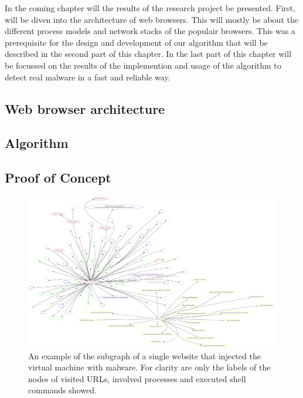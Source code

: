 
In the coming chapter will the results of the research project be presented. First, will be diven into the architecture of web browsers. This will mostly be about the different process models and network stacks of the populair browsers. This was a prerequisite for the design and development of our algorithm that will be described in the second part of this chapter. In the last part of this chapter will be focussed on the results of the implemention and usage of the algorithm to detect real malware  in a fast and reliable way.

\subsection{Web browser architecture}


\subsection{Algorithm}


\subsection{Proof of Concept}



\begin{figure}[h]
    \centering
    \includegraphics[width=25cm, angle=90]{Images/report_Subprocess_from_tab}
    \caption{An example of the subgraph of a single website that injected the virtual machine with malware. For clarity are only the labels of the nodes of visited URLs, involved processes and executed shell commands showed.}
    \label{fig:subgraph}
\end{figure}

\restoregeometry